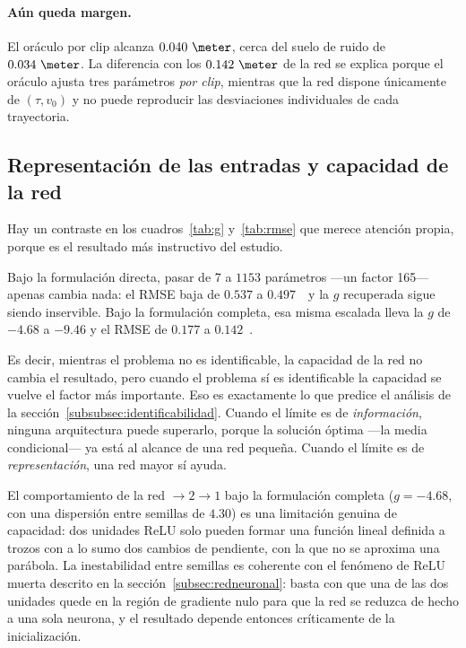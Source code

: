 \documentclass[titlepage,11pt]{article}
\providecommand{\num}[1]{\ensuremath{#1}}
\begin{document}
\paragraph{Aún queda margen.} El oráculo por clip alcanza
$\num{0.040}~\meter$, cerca del suelo de ruido de $\num{0.034}~\meter$. La
diferencia con los $\num{0.142}~\meter$ de la red se explica porque el oráculo
ajusta tres parámetros \emph{por clip}, mientras que la red dispone únicamente
de $(\tau,v_0)$ y no puede reproducir las desviaciones individuales de cada
trayectoria.

\subsection{Representación de las entradas y capacidad de la red}
\label{subsec:capacidad}

Hay un contraste en los cuadros~\ref{tab:g} y~\ref{tab:rmse} que merece atención
propia, porque es el resultado más instructivo del estudio.

Bajo la formulación directa, pasar de 7 a \num{1153} parámetros ---un factor
165--- apenas cambia nada: el RMSE baja de \num{0.537} a \num{0.497}~\meter\ y
la $g$ recuperada sigue siendo inservible. Bajo la formulación completa, esa
misma escalada lleva la $g$ de $\num{-4.68}$ a $\num{-9.46}$ y el RMSE de
\num{0.177} a \num{0.142}~\meter.

Es decir, mientras el problema no es identificable, la capacidad de la red no
cambia el resultado, pero cuando el problema sí es identificable la capacidad
se vuelve el factor más importante. Eso es
exactamente lo que predice el análisis de la
sección~\ref{subsubsec:identificabilidad}. Cuando el límite es de
\emph{información}, ninguna arquitectura puede superarlo, porque la solución
óptima ---la media condicional--- ya está al alcance de una red pequeña. Cuando
el límite es de \emph{representación}, una red mayor sí ayuda.

El comportamiento de la red $\to2\to1$ bajo la formulación completa
($g=\num{-4.68}$, con una dispersión entre semillas de $\num{4.30}$) es una
limitación genuina de capacidad: dos unidades ReLU solo pueden formar una
función lineal definida a trozos con a lo sumo dos cambios de pendiente, con la
que no se aproxima una parábola. La inestabilidad entre semillas es coherente con el fenómeno de ReLU
muerta descrito en la sección~\ref{subsec:redneuronal}: basta con que una de las
dos unidades quede en la región de gradiente nulo para que la red se reduzca de
hecho a una sola neurona, y el resultado depende entonces críticamente de la
inicialización.
\end{document}
